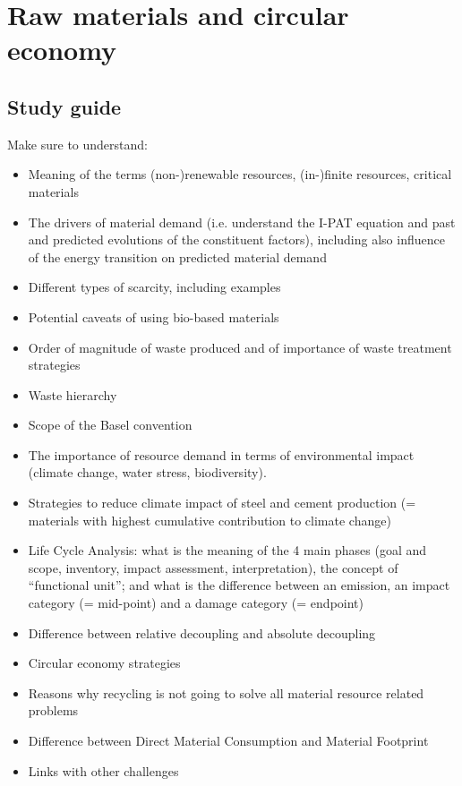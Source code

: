 \documentclass[../summary.tex]{subfiles}
\begin{document}
	
	\section{Raw materials and circular economy}
	
	\subsection{Study guide}
	
	Make sure to understand:
	\begin{itemize}
		\setlength{\itemsep}{0pt}
		\item  Meaning of the terms (non-)renewable resources, (in-)finite resources, critical materials
		\item The drivers of material demand (i.e. understand the I-PAT equation and past and predicted evolutions of the constituent factors), including also influence of the energy transition on predicted material demand
		\item Different types of scarcity, including examples
		\item Potential caveats of using bio-based materials
		\item Order of magnitude of waste produced and of importance of waste treatment strategies
		\item Waste hierarchy
		\item Scope of the Basel convention
		\item The importance of resource demand in terms of environmental impact (climate change, water stress, biodiversity).
		\item Strategies to reduce climate impact of steel and cement production (= materials with highest cumulative contribution to climate change)
		\item Life Cycle Analysis: what is the meaning of the 4 main phases (goal and scope, inventory, impact assessment, interpretation), the concept of “functional unit”; and what is the difference between
		an emission, an impact category (= mid-point) and a damage category (= endpoint)
		\item Difference between relative decoupling and absolute decoupling
		\item Circular economy strategies
		\item Reasons why recycling is not going to solve all material resource related problems
		\item Difference between Direct Material Consumption and Material Footprint
		\item Links with other challenges
	\end{itemize}
	
\end{document}
